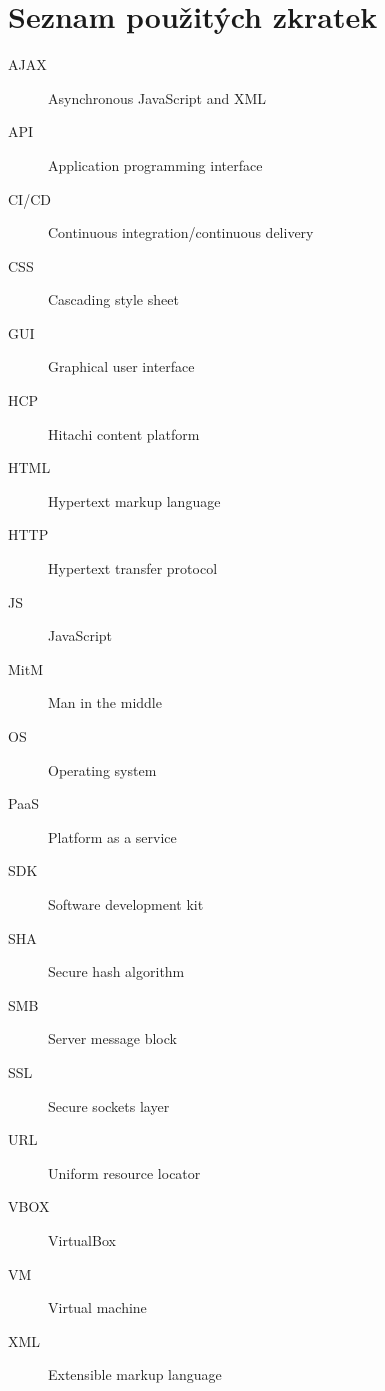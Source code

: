 \documentclass[thesis=M,czech,hidelinks]{FITthesis}[2013/05/06]
\begin{document}
\chapter{Seznam použitých zkratek}
 \printglossaries
\begin{description}
	\item[AJAX] Asynchronous JavaScript and XML
	\item[API] Application programming interface
	\item[CI/CD] Continuous integration/continuous delivery
	\item[CSS] Cascading style sheet
	\item[GUI] Graphical user interface
	\item[HCP] Hitachi content platform
	\item[HTML] Hypertext markup language
	\item[HTTP] Hypertext transfer protocol
	\item[JS] JavaScript
	\item[MitM] Man in the middle
	\item[OS] Operating system
	\item[PaaS] Platform as a service
	\item[SDK] Software development kit
	\item[SHA] Secure hash algorithm
	\item[SMB] Server message block
	\item[SSL] Secure sockets layer
	\item[URL] Uniform resource locator
	\item[VBOX] VirtualBox
	\item[VM] Virtual machine
	\item[XML] Extensible markup language
\end{description}
\end{document}
